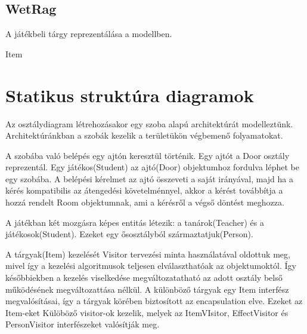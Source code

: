 \subsection{WetRag}
\begin{class-template-responsibility}
A játékbeli tárgy reprezentálása a modellben.
\end{class-template-responsibility}
\begin{class-template-interface}
    Item
\end{class-template-interface}
\begin{class-template-attribute}
\end{class-template-attribute}

\section{Statikus struktúra diagramok}

Az osztálydiagram létrehozásakor egy szoba alapú architektúrát modelleztünk. Architektúránkban a szobák kezelik a területükön végbemenő folyamatokat. 

A szobába való belépés egy ajtón keresztül történik. Egy ajtót a Door osztály reprezentál. Egy játékos(Student) az ajtó(Door) objektumhoz fordulva léphet be egy szobába. A belépési kérelmet az ajtó összeveti a saját irányával, majd ha a kérés kompatibilis az átengedési követelménnyel, akkor a kérést továbbítja a hozzá rendelt Room objektumnak, ami a kérésről a végső döntést meghozza.

A játékban két mozgásra képes entitás létezik: a tanárok(Teacher) és a játékosok(Student). Ezeket egy ősosztályból származtatjuk(Person).

A tárgyak(Item) kezelését Visitor tervezési minta használatával oldottuk meg, mivel így a kezelési algoritmusok teljesen elválaszthatóak az objektumoktól. Így későbbiekben a kezelés viselkedése megváltozatatható az adott osztály belső működésének megváltozattása nélkül. A különböző tárgyak egy Item interfész megvalósításai, így a tárgyak körében biztosított az encapsulation elve. Ezeket az Item-eket Külöböző visitor-ok kezelik, melyek az ItemVIsitor, EffectVisitor és PersonVisitor interfészeket valósítják meg.

\clearpage

